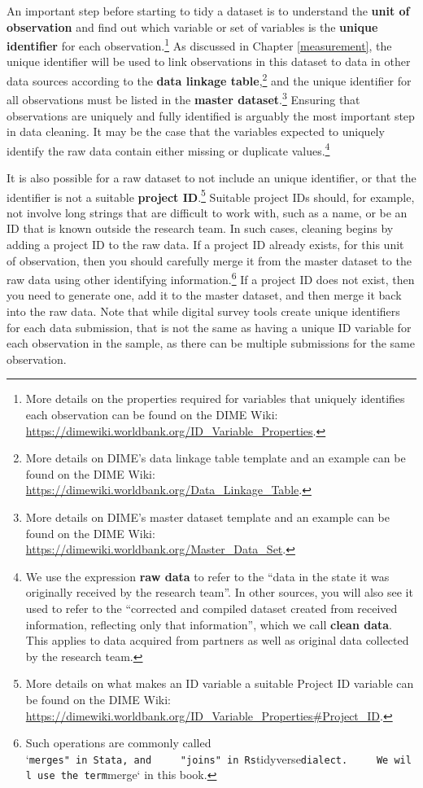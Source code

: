 \documentclass[
]{book}
\begin{document}
An important step before starting to tidy a dataset is
to understand the \textbf{unit of observation}
and find out which variable or set of variables
is the \textbf{unique identifier} for each observation.\footnote{More details on the properties required for variables
  that uniquely identifies each observation
  can be found on the DIME Wiki:
  \url{https://dimewiki.worldbank.org/ID_Variable_Properties}.}
As discussed in Chapter \ref{measurement},
the unique identifier will be used to link observations in this dataset
to data in other data sources according to the \textbf{data linkage table},\footnote{More details on DIME's data linkage table template
  and an example can be found on the DIME Wiki:
  \url{https://dimewiki.worldbank.org/Data_Linkage_Table}.}
and the unique identifier for all observations
must be listed in the \textbf{master dataset}.\footnote{More details on DIME's master dataset template
  and an example can be found on the DIME Wiki:
  \url{https://dimewiki.worldbank.org/Master_Data_Set}.}
Ensuring that observations are uniquely and fully identified
is arguably the most important step in data cleaning.
It may be the case that the variables expected to uniquely identify
the raw data contain either missing or duplicate values.\footnote{We use the expression \textbf{raw data}
  to refer to the ``data in the state it was originally received by the research team''.
  In other sources, you will also see it used to refer to the
  ``corrected and compiled dataset created from received information,
  reflecting only that information'',
  which we call \textbf{clean data}.
  This applies to data acquired from partners as well as
  original data collected by the research team.}

It is also possible for a raw dataset to not include an unique identifier,
or that the identifier is not a suitable \textbf{project ID}.\footnote{More details on what makes an ID variable
  a suitable Project ID variable
  can be found on the DIME Wiki:
  \url{https://dimewiki.worldbank.org/ID_Variable_Properties\#Project_ID}.}
Suitable project IDs should, for example, not involve long strings
that are difficult to work with, such as a name,
or be an ID that is known outside the research team.
In such cases, cleaning begins by
adding a project ID to the raw data.
If a project ID already exists,
for this unit of observation,
then you should carefully merge it
from the master dataset
to the raw data
using other identifying information.\footnote{Such
  operations are commonly called `\texttt{merges"\ in\ Stata,\ and\ \ \ \ \ "joins"\ in\ R\textquotesingle{}s}tidyverse\texttt{dialect.\ \ \ \ \ We\ will\ use\ the\ term}merge` in this book.}
If a project ID does not exist,
then you need to generate one,
add it to the master dataset,
and then merge it back into the raw data.
Note that while digital survey tools create
unique identifiers for each data submission,
that is not the same as having a unique ID variable
for each observation in the sample,
as there can be multiple submissions
for the same observation.
\end{document}
